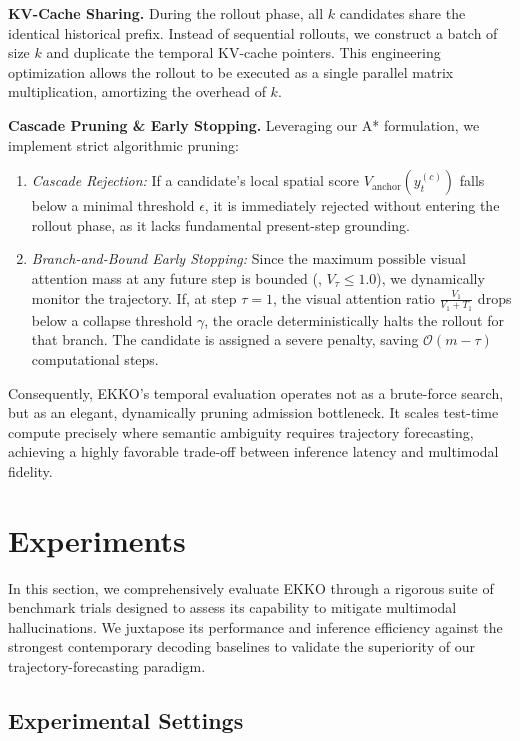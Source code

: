 \noindent\textbf{KV-Cache Sharing.} During the rollout phase, all $k$ candidates share the identical historical prefix. Instead of sequential rollouts, we construct a batch of size $k$ and duplicate the temporal KV-cache pointers. This engineering optimization allows the rollout to be executed as a single parallel matrix multiplication, amortizing the overhead of $k$.

\noindent\textbf{Cascade Pruning \& Early Stopping.} Leveraging our A* formulation, we implement strict algorithmic pruning:
\begin{enumerate}
    \item \textit{Cascade Rejection:} If a candidate's local spatial score $V_{\mathrm{anchor}}(y_t^{(c)})$ falls below a minimal threshold $\epsilon$, it is immediately rejected without entering the rollout phase, as it lacks fundamental present-step grounding.
    \item \textit{Branch-and-Bound Early Stopping:} Since the maximum possible visual attention mass at any future step is bounded (\eg, $V_\tau \le 1.0$), we dynamically monitor the trajectory. If, at step $\tau=1$, the visual attention ratio $\frac{V_1}{V_1 + T_1}$ drops below a collapse threshold $\gamma$, the oracle deterministically halts the rollout for that branch. The candidate is assigned a severe penalty, saving $\mathcal{O}(m-\tau)$ computational steps.
\end{enumerate}

Consequently, EKKO's temporal evaluation operates not as a brute-force search, but as an elegant, dynamically pruning admission bottleneck. It scales test-time compute precisely where semantic ambiguity requires trajectory forecasting, achieving a highly favorable trade-off between inference latency and multimodal fidelity.

\section{Experiments}
\label{sec:experiments}

In this section, we comprehensively evaluate EKKO through a rigorous suite of benchmark trials designed to assess its capability to mitigate multimodal hallucinations. We juxtapose its performance and inference efficiency against the strongest contemporary decoding baselines to validate the superiority of our trajectory-forecasting paradigm.

\subsection{Experimental Settings}


